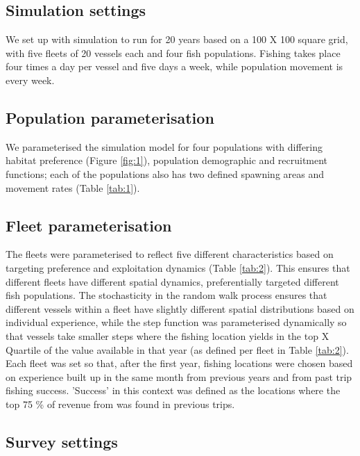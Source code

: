 \documentclass[review]{elsarticle}
\begin{document}
\subsection{Simulation settings}

We set up with simulation to run for 20 years based on a 100 X 100 square grid,
with five fleets of 20 vessels each and four fish populations. Fishing takes
place four times a day per vessel and five days a week, while population
movement is every week.  

\subsection{Population parameterisation}

We parameterised the simulation model for four populations with differing
habitat preference (Figure \ref{fig:1}), population demographic and recruitment
functions; each of the populations also has two defined spawning areas and
movement rates (Table \ref{tab:1}). \\

\subsection{Fleet parameterisation}

The fleets were parameterised to reflect five different characteristics based
on targeting preference and exploitation dynamics (Table \ref{tab:2}). This
ensures that different fleets have different spatial dynamics, preferentially
targeted different fish populations. The stochasticity in the random walk
process ensures that different vessels within a fleet have slightly different
spatial distributions based on individual experience, while the step function
was parameterised dynamically so that vessels take smaller steps where the
fishing location yields in the top X Quartile of the value available in that
year (as defined per fleet in Table \ref{tab:2}). \\

Each fleet was set so that, after the first year, fishing locations were chosen
based on experience built up in the same month from previous years and from
past trip fishing success. 'Success' in this context was defined as the
locations where the top 75 \% of revenue from was found in previous trips. 

\subsection{Survey settings}
\end{document}

